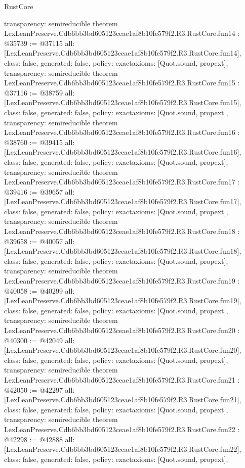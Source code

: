 \begin{lexlean}{RustCore}
\begin{coremodule}
{  transparency: semireducible
}
theorem LexLeanPreserve.Cdb6bb3bd605123ceae1af8b10fe579f2.R3.RustCore.fun14 : @35739 := @37115 {
  all: [LexLeanPreserve.Cdb6bb3bd605123ceae1af8b10fe579f2.R3.RustCore.fun14],
  class: false,
  generated: false,
  policy: exact{axioms: [Quot.sound, propext]},
  transparency: semireducible
}
theorem LexLeanPreserve.Cdb6bb3bd605123ceae1af8b10fe579f2.R3.RustCore.fun15 : @37116 := @38759 {
  all: [LexLeanPreserve.Cdb6bb3bd605123ceae1af8b10fe579f2.R3.RustCore.fun15],
  class: false,
  generated: false,
  policy: exact{axioms: [Quot.sound, propext]},
  transparency: semireducible
}
theorem LexLeanPreserve.Cdb6bb3bd605123ceae1af8b10fe579f2.R3.RustCore.fun16 : @38760 := @39415 {
  all: [LexLeanPreserve.Cdb6bb3bd605123ceae1af8b10fe579f2.R3.RustCore.fun16],
  class: false,
  generated: false,
  policy: exact{axioms: [Quot.sound, propext]},
  transparency: semireducible
}
theorem LexLeanPreserve.Cdb6bb3bd605123ceae1af8b10fe579f2.R3.RustCore.fun17 : @39416 := @39657 {
  all: [LexLeanPreserve.Cdb6bb3bd605123ceae1af8b10fe579f2.R3.RustCore.fun17],
  class: false,
  generated: false,
  policy: exact{axioms: [Quot.sound, propext]},
  transparency: semireducible
}
theorem LexLeanPreserve.Cdb6bb3bd605123ceae1af8b10fe579f2.R3.RustCore.fun18 : @39658 := @40057 {
  all: [LexLeanPreserve.Cdb6bb3bd605123ceae1af8b10fe579f2.R3.RustCore.fun18],
  class: false,
  generated: false,
  policy: exact{axioms: [Quot.sound, propext]},
  transparency: semireducible
}
theorem LexLeanPreserve.Cdb6bb3bd605123ceae1af8b10fe579f2.R3.RustCore.fun19 : @40058 := @40299 {
  all: [LexLeanPreserve.Cdb6bb3bd605123ceae1af8b10fe579f2.R3.RustCore.fun19],
  class: false,
  generated: false,
  policy: exact{axioms: [Quot.sound, propext]},
  transparency: semireducible
}
theorem LexLeanPreserve.Cdb6bb3bd605123ceae1af8b10fe579f2.R3.RustCore.fun20 : @40300 := @42049 {
  all: [LexLeanPreserve.Cdb6bb3bd605123ceae1af8b10fe579f2.R3.RustCore.fun20],
  class: false,
  generated: false,
  policy: exact{axioms: [Quot.sound, propext]},
  transparency: semireducible
}
theorem LexLeanPreserve.Cdb6bb3bd605123ceae1af8b10fe579f2.R3.RustCore.fun21 : @42050 := @42297 {
  all: [LexLeanPreserve.Cdb6bb3bd605123ceae1af8b10fe579f2.R3.RustCore.fun21],
  class: false,
  generated: false,
  policy: exact{axioms: [Quot.sound, propext]},
  transparency: semireducible
}
theorem LexLeanPreserve.Cdb6bb3bd605123ceae1af8b10fe579f2.R3.RustCore.fun22 : @42298 := @42888 {
  all: [LexLeanPreserve.Cdb6bb3bd605123ceae1af8b10fe579f2.R3.RustCore.fun22],
  class: false,
  generated: false,
  policy: exact{axioms: [Quot.sound, propext]},
}
\end{coremodule}
\end{lexlean}
